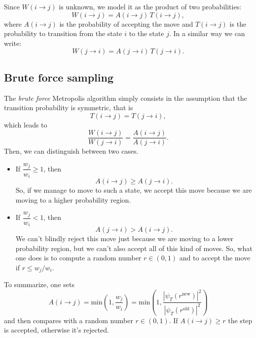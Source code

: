 \documentclass[a4paper,twoside,11pt]{book}
\begin{document}
Since $W(i \rightarrow j)$ is unknown, we model it as the product of two probabilities:
\begin{equation}
	W(i \rightarrow j)=A(i \rightarrow j) \, T(i \rightarrow j),
\end{equation}
where $A(i \rightarrow j)$ is the probability of accepting the move and $T(i \rightarrow j)$ is the probability to transition from the state $i$ to the state $j$. In a similar way we can write:
\begin{equation}
	W(j \rightarrow i)=A(j \rightarrow i) \, T(j \rightarrow i).
\end{equation}

\subsection{Brute force sampling}
The \emph{brute force} Metropolis algorithm simply consists in the assumption that the transition probability is symmetric, that is
\begin{equation}
	T(i \rightarrow j)= T (j \rightarrow i),
\end{equation}
which leads to
\begin{equation}
	\frac{W(i \rightarrow j )}{W(j \rightarrow i)}=\frac{A(i \rightarrow j )}{A(j \rightarrow i)}.
\end{equation}
Then, we can distinguish between two cases.
\begin{itemize}
	\item If $\dfrac{w_j}{w_i}\geq 1$, then
	\begin{equation}
		A(i \rightarrow j ) \geq A(j \rightarrow i).
	\end{equation}
	So, if we manage to move to such a state, we accept this move because we are moving to a higher probability region.
	\item If $\dfrac{w_j}{w_i} < 1$, then
	\begin{equation}
		A(j \rightarrow i ) > A(i \rightarrow j).
	\end{equation}
	We can't blindly reject this move just because we are moving to a lower probability region, but we can't also accept all of this kind of moves. So, what one does is to compute a random number $r \in (0,1)$ and to accept the move if $r \leq w_j/w_i$.
\end{itemize}
To summarize, one sets
\begin{equation}
	A(i\rightarrow j) 
	= \text{min} \left(1, \frac{w_j}{w_i} \right)
	= \text{min} \left(1, \frac{|\psi_T(r^{\text{new}})|^2}{|\psi_T(r^{\text{old}})|^2} \right)
\end{equation}
and then compares with a random number $r \in (0,1)$. If $A(i\rightarrow j) \geq r$ the step is accepted, otherwise it's rejected.
\end{document}
